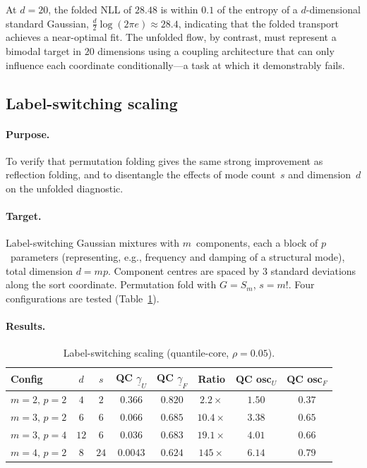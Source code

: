 At $d = 20$, the folded NLL of $28.48$ is within $0.1$ of the
entropy of a $d$-dimensional standard Gaussian,
$\tfrac{d}{2}\log(2\pi e) \approx 28.4$, indicating that the
folded transport achieves a near-optimal fit.
The unfolded flow, by contrast, must represent a bimodal target in
$20$ dimensions using a coupling architecture that can only
influence each coordinate conditionally---a task at which it
demonstrably fails.


\subsection{Label-switching scaling}
\label{sec:exp_labelswitching}

\paragraph{Purpose.}
To verify that permutation folding gives the same strong
improvement as reflection folding, and to disentangle the effects
of mode count~$s$ and dimension~$d$ on the unfolded diagnostic.

\paragraph{Target.}
Label-switching Gaussian mixtures with $m$~components, each a
block of $p$~parameters (representing, e.g., frequency and damping
of a structural mode), total dimension $d = mp$.  Component centres
are spaced by $3$ standard deviations along the sort coordinate.
Permutation fold with $G = S_m$, $s = m!$.  Four configurations
are tested (Table~\ref{tab:labelswitching}).

\paragraph{Results.}

\begin{table}[t]
\centering
\caption{Label-switching scaling (quantile-core, $\rho = 0.05$).}
\label{tab:labelswitching}
\smallskip
\begin{tabular}{lccccccc}
\hline
Config & $d$ & $s$ & QC $\underline{\gamma}_U$ & QC $\underline{\gamma}_F$
       & Ratio & QC osc$_U$ & QC osc$_F$ \\
\hline
$m{=}2,\,p{=}2$ & $4$  & $2$   & $0.366$ & $0.820$ & $2.2\times$   & $1.50$ & $0.37$ \\
$m{=}3,\,p{=}2$ & $6$  & $6$   & $0.066$ & $0.685$ & $10.4\times$  & $3.38$ & $0.65$ \\
$m{=}3,\,p{=}4$ & $12$ & $6$   & $0.036$ & $0.683$ & $19.1\times$  & $4.01$ & $0.66$ \\
$m{=}4,\,p{=}2$ & $8$  & $24$  & $0.0043$ & $0.624$ & $145\times$   & $6.14$ & $0.79$ \\
\hline
\end{tabular}
\end{table}

